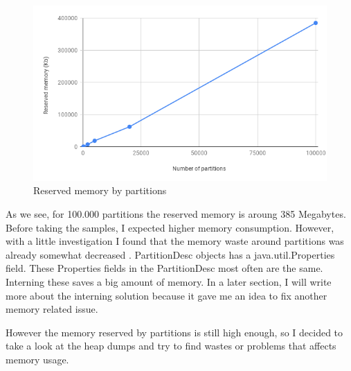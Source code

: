 \begin{figure}[H]
	\includegraphics[width=150mm, keepaspectratio]{figures/partitions_chart.png}
	\centering
	\caption{Reserved memory by partitions}
\end{figure}

As we see, for 100.000 partitions the reserved memory is aroung 385 Megabytes. Before taking the samples, I expected higher memory consumption. However, with a little investigation I found that the memory waste around partitions was already somewhat decreased \cite{hive-partitions}. PartitionDesc objects has a java.util.Properties field. These Properties fields in the PartitionDesc most often are the same. Interning these saves a big amount of memory. In a later section, I will write more about the interning solution because it gave me an idea to fix another memory related issue.

However the memory reserved by partitions is still high enough, so I decided to take a look at the heap dumps and try to find wastes or problems that affects memory usage.